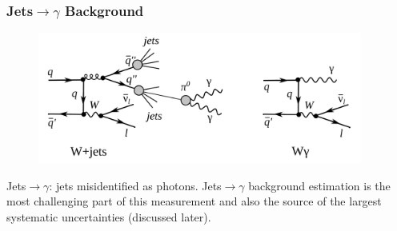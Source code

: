 \begin{frame}\frametitle{Jets$\rightarrow \gamma$ Background}
\begin{figure}[htb]
  \begin{center}
    {\includegraphics[width=0.95\textwidth]{../figs/ForPresentation/feynmWjets.png}}
  \end{center}
\end{figure}
  \scriptsize
  Jets$\rightarrow \gamma$: jets misidentified as photons.
  \tiny  
  Jets$\rightarrow \gamma$ background estimation is the most challenging part of this measurement and also the source of the largest systematic uncertainties (discussed later).
\end{frame}

